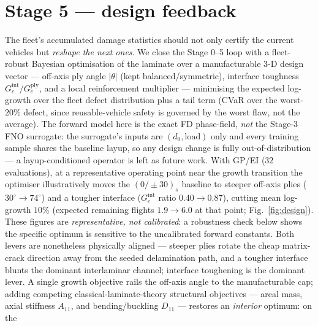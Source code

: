 \documentclass[11pt]{article}
\begin{document}
\section{Stage 5 --- design feedback}
The fleet's accumulated damage statistics should not only certify the current
vehicles but \emph{reshape the next ones}. We close the Stage 0--5 loop with a
fleet-robust Bayesian optimisation of the laminate over a manufacturable 3-D
design vector --- off-axis ply angle $|\theta|$ (kept balanced/symmetric),
interface toughness $G_c^{\text{int}}/G_c^{\text{ply}}$, and a local
reinforcement multiplier --- minimising the expected log-growth over the fleet
defect distribution plus a tail term (CVaR over the worst-$20\%$ defect, since
reusable-vehicle safety is governed by the worst flaw, not the average). The
forward model here is the exact FD phase-field, \emph{not} the Stage-3 FNO
surrogate: the surrogate's inputs are $(d_0,\text{load})$ only and every
training sample shares the baseline layup, so any design change is fully
out-of-distribution --- a layup-conditioned operator is left as future work.
With GP/EI ($32$ evaluations), at a representative operating point near the
growth transition the optimiser illustratively moves the $(0/{\pm}30)_s$ baseline
to steeper off-axis plies ($30^\circ\!\to\!74^\circ$) and a tougher interface
($G_c^{\text{int}}$ ratio $0.40\!\to\!0.87$), cutting mean log-growth $10\%$
(expected remaining flights $1.9\!\to\!6.0$ at that point; Fig.~\ref{fig:design}).
These figures are \emph{representative, not calibrated}: a robustness check below
shows the specific optimum is sensitive to the uncalibrated forward constants.
Both levers are nonetheless physically aligned --- steeper plies
rotate the cheap matrix-crack direction away from the seeded delamination path,
and a tougher interface blunts the dominant interlaminar channel; interface
toughening is the dominant lever. A single growth objective rails the off-axis
angle to the manufacturable cap; adding competing classical-laminate-theory
structural objectives --- areal mass, axial stiffness $A_{11}$, and
bending/buckling $D_{11}$ --- restores an \emph{interior} optimum: on the
\end{document}
